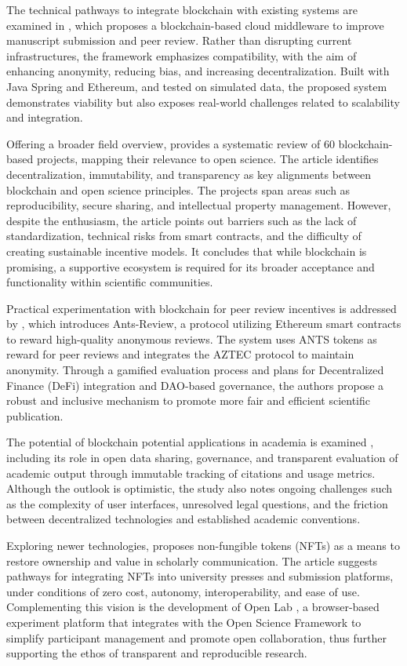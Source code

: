 \documentclass[final]{rc-book-2.14}
\begin{document}
The technical pathways to integrate blockchain with existing systems are examined in \cite{gazis_blockchain_2022}, which proposes a blockchain-based cloud middleware to improve manuscript submission and peer review. Rather than disrupting current infrastructures, the framework emphasizes compatibility, with the aim of enhancing anonymity, reducing bias, and increasing decentralization. Built with Java Spring and Ethereum, and tested on simulated data, the proposed system demonstrates viability but also exposes real-world challenges related to scalability and integration.

Offering a broader field overview, \cite{leible_review_2019} provides a systematic review of 60 blockchain-based projects, mapping their relevance to open science. The article identifies decentralization, immutability, and transparency as key alignments between blockchain and open science principles. The projects span areas such as reproducibility, secure sharing, and intellectual property management. However, despite the enthusiasm, the article points out barriers such as the lack of standardization, technical risks from smart contracts, and the difficulty of creating sustainable incentive models. It concludes that while blockchain is promising, a supportive ecosystem is required for its broader acceptance and functionality within scientific communities.

Practical experimentation with blockchain for peer review incentives is addressed by \cite{trovo_ants-review_2021}, which introduces Ants-Review, a protocol utilizing Ethereum smart contracts to reward high-quality anonymous reviews. The system uses ANTS tokens as reward for peer reviews and integrates the AZTEC protocol to maintain anonymity. Through a gamified evaluation process and plans for Decentralized Finance (DeFi) integration and DAO-based governance, the authors propose a robust and inclusive mechanism to promote more fair and efficient scientific publication.

The potential of blockchain potential applications in academia is examined \cite{kosmarski_blockchain_2020}, including its role in open data sharing, governance, and transparent evaluation of academic output through immutable tracking of citations and usage metrics. Although the outlook is optimistic, the study also notes ongoing challenges such as the complexity of user interfaces, unresolved legal questions, and the friction between decentralized technologies and established academic conventions.

Exploring newer technologies, \cite{putnings_non-fungible_2022} proposes non-fungible tokens (NFTs) as a means to restore ownership and value in scholarly communication. The article suggests pathways for integrating NFTs into university presses and submission platforms, under conditions of zero cost, autonomy, interoperability, and ease of use. Complementing this vision is the development of Open Lab \cite{shevchenko_open_2022}, a browser-based experiment platform that integrates with the Open Science Framework to simplify participant management and promote open collaboration, thus further supporting the ethos of transparent and reproducible research.
\end{document}
